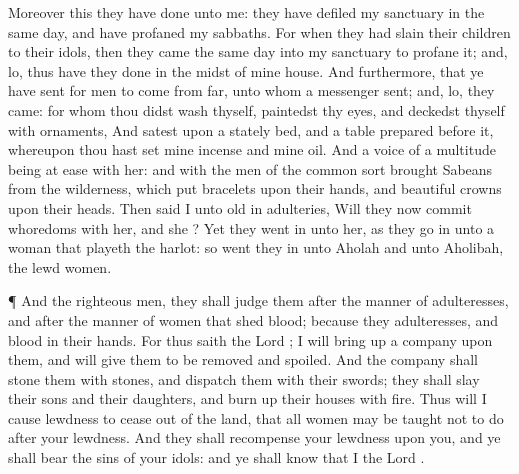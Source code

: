 {Moreover this they have
done unto me: they have
defiled my
sanctuary in the same
day, and have
profaned my
sabbaths.
For when they had
slain their
children to their
idols, then they
came the same
day into my
sanctuary to
profane it; and, lo, thus have they
done in the
midst of mine
house.
And
furthermore, that ye have
sent for
men to
come from
far, unto whom a
messenger
{}
sent; and, lo, they
came: for whom thou didst
wash thyself,
paintedst thy
eyes, and
deckedst thyself with
ornaments,
And
satest upon a
stately
bed, and a
table
prepared
before it, whereupon thou hast
set mine
incense and mine
oil.
And a
voice of a
multitude being at
ease
{} with her: and with the
men of the common
sort
{}
brought
Sabeans from the
wilderness, which
put
bracelets upon their
hands, and
beautiful
crowns upon their
heads.
Then
said I unto
{}
old in
adulteries, Will they now
commit
whoredoms with her, and she
{}?
Yet they went
in unto her, as they go
in unto a
woman that playeth the
harlot: so went they
in unto
Aholah and unto
Aholibah, the
lewd
women.
\par }{\PP {}¶ And the
righteous
men, they shall
judge them after the
manner of
adulteresses, and after the
manner of women that
shed
blood; because they
{}
adulteresses, and
blood
{} in their
hands.
For thus
saith the
Lord
{}; I will bring
up a
company upon them, and will
give them to be
removed and
spoiled.
And the
company shall
stone them with
stones, and
dispatch them with their
swords; they shall
slay their
sons and their
daughters, and burn
up their
houses with
fire.
Thus will I cause
lewdness to
cease out of the
land, that all
women may be
taught not to
do after your
lewdness.
And they shall
recompense your
lewdness upon you, and ye shall
bear the
sins of your
idols: and ye shall
know that I
{} the
Lord
{}.

}
